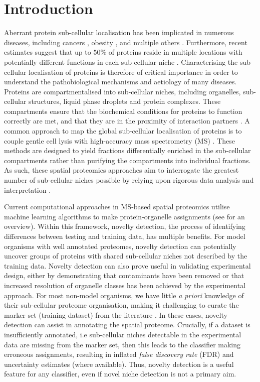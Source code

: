 \documentclass[12pt,english]{article}
\begin{document}
\section{Introduction}
Aberrant protein sub-cellular localisation has been implicated in numerous diseases, including cancers \citep{Kau:2004}, obesity \citep{Siljee:2018}, and multiple others \citep{Laurila:2009}. Furthermore, recent estimates suggest that up to $50\%$ of proteins reside in multiple locations with potentially different functions in each sub-cellular niche \citep{hyper, Thul:2017}. Characterising the sub-cellular localisation of proteins is therefore of critical importance in order to understand the pathobiological mechanisms and aetiology of many diseases. Proteins are compartmentalised into sub-cellular niches, including organelles, sub-cellular structures, liquid phase droplets and protein complexes. These compartments ensure that the biochemical conditions for proteins to function correctly are met, and that they are in the proximity of interaction partners \citep{Gibson:2009}. A common approach to map the global sub-cellular localisation of proteins is to couple gentle cell lysis with high-accuracy mass spectrometry (MS) \citep{hyper, Mulvey:2017, DC:2018, Orre:2019}. These methods are designed to yield fractions differentially enriched in the sub-cellular compartments rather than purifying the compartments into individual fractions. As such, these spatial proteomics approaches aim to interrogate the greatest number of sub-cellular niches possible by relying upon rigorous data analysis and interpretation \citep{Gatto:2010, Gatto:2014b}.

Current computational approaches in MS-based spatial proteomics utilise machine learning algorithms to make protein-organelle assignments (see \cite{Gatto:2014b} for an overview). Within this framework, novelty detection, the process of identifying differences between testing and training data, has multiple benefits. For model organisms with well annotated proteomes, novelty detection can potentially uncover groups of proteins with shared sub-cellular niches not described by the training data. Novelty detection can also prove useful in validating experimental design, either by demonstrating that contaminants have been removed or that increased resolution of organelle classes has been achieved by the experimental approach. For most non-model organisms, we have little \textit{a priori} knowledge of their sub-cellular proteome organisation, making it challenging to curate the marker set (training dataset) from the literature \citep{Barylyuk::2020}. In these cases, novelty detection can assist in annotating the spatial proteome.  Crucially, if a dataset is insufficiently annotated, i.e sub-cellular niches detectable in the experimental data are missing from the marker set, then this leads to the classifier making erroneous assignments, resulting in inflated \textit{false discovery rate} (FDR) and uncertainty estimates (where available). Thus, novelty detection is a useful feature for any classifier, even if novel niche detection is not a primary aim.
\end{document}
